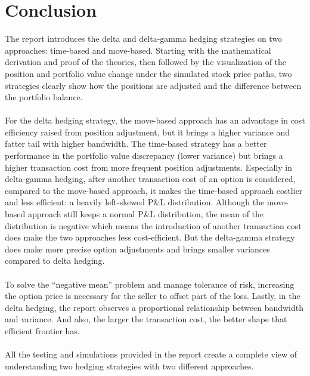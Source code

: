\documentclass[12pt]{article}
\begin{document}
\section{Conclusion}
The report introduces the delta and delta-gamma hedging strategies on two approaches: time-based and move-based. Starting with the mathematical derivation and proof of the theories, then followed by the visualization of the position and portfolio value change under the simulated stock price paths, 
two strategies clearly show how the positions are adjusted and the difference between the portfolio balance. 
\\\\
For the delta hedging strategy, the move-based approach has an advantage in cost efficiency raised from position adjustment, but it brings a higher variance and fatter tail with higher bandwidth. The time-based strategy has a better performance in the portfolio value discrepancy (lower variance) but 
brings a higher transaction cost from more frequent position adjustments. Especially in delta-gamma hedging, after another transaction cost of an option is considered, compared to the move-based approach, it makes the time-based approach costlier and less efficient: a heavily left-skewed P\&L distribution. 
Although the move-based approach still keeps a normal P\&L distribution, the mean of the distribution is negative which means the introduction of another transaction cost does make the two approaches less cost-efficient. But the delta-gamma strategy does make more precise option adjustments and brings smaller 
variances compared to delta hedging. 
\\\\
To solve the “negative mean” problem and manage tolerance of risk, increasing the option price is necessary for the seller to offset part of the loss. Lastly, in the delta hedging, the report observes a proportional relationship between bandwidth and variance. And also, the larger the transaction cost, 
the better shape that efficient frontier has.
\\\\
All the testing and simulations provided in the report create a complete view of understanding two hedging strategies with two different approaches.
\end{document}
